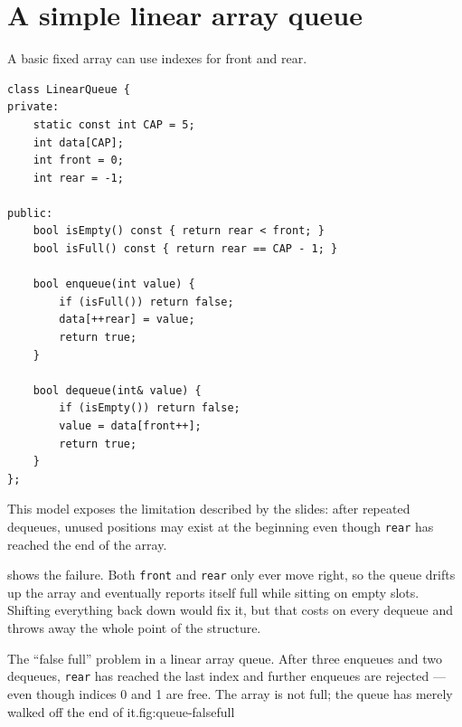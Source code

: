 \section{A simple linear array queue}

A basic fixed array can use indexes for front and rear.

\begin{lstlisting}
class LinearQueue {
private:
    static const int CAP = 5;
    int data[CAP];
    int front = 0;
    int rear = -1;

public:
    bool isEmpty() const { return rear < front; }
    bool isFull() const { return rear == CAP - 1; }

    bool enqueue(int value) {
        if (isFull()) return false;
        data[++rear] = value;
        return true;
    }

    bool dequeue(int& value) {
        if (isEmpty()) return false;
        value = data[front++];
        return true;
    }
};
\end{lstlisting}

This model exposes the limitation described by the slides: after repeated dequeues, unused positions may exist at the beginning even though \texttt{rear} has reached the end of the array.

 shows the failure. Both \texttt{front} and \texttt{rear} only
ever move right, so the queue drifts up the array and eventually reports itself full while
sitting on empty slots. Shifting everything back down would fix it, but that costs
 on every dequeue and throws away the whole point of the structure.

\begin{adsfig}{The ``false full'' problem in a linear array queue. After three enqueues and
two dequeues, \texttt{rear} has reached the last index and further enqueues are rejected ---
even though indices 0 and 1 are free. The array is not full; the queue has merely walked off
the end of it.}{fig:queue-falsefull}
\end{adsfig}

